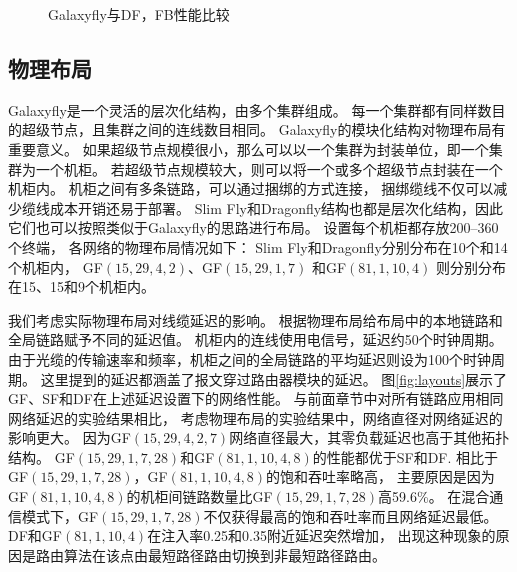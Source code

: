 \begin{figure}
  \centering
  \begin{minipage}[t]{\textwidth}
    \centering
    \caption{Galaxyfly与DF，FB性能比较}
    \label{fig:gfsfdf}
  \end{minipage}
\end{figure}

\subsection{物理布局}

Galaxyfly是一个灵活的层次化结构，由多个集群组成。
每一个集群都有同样数目的超级节点，且集群之间的连线数目相同。
Galaxyfly的模块化结构对物理布局有重要意义。
如果超级节点规模很小，那么可以以一个集群为封装单位，即一个集群为一个机柜。
若超级节点规模较大，则可以将一个或多个超级节点封装在一个机柜内。
机柜之间有多条链路，可以通过捆绑的方式连接，
捆绑缆线不仅可以减少缆线成本开销还易于部署。
Slim Fly和Dragonfly结构也都是层次化结构，因此它们也可以按照类似于Galaxyfly的思路进行布局。
设置每个机柜都存放200--360个终端，
各网络的物理布局情况如下：
Slim Fly和Dragonfly分别分布在10个和14个机柜内，
GF$(15,29,4,2)$、GF$(15,29,1,7)$ 和GF$(81,1,10,4)$
则分别分布在15、15和9个机柜内。

我们考虑实际物理布局对线缆延迟的影响。
根据物理布局给布局中的本地链路和全局链路赋予不同的延迟值。
机柜内的连线使用电信号，延迟约50个时钟周期。
由于光缆的传输速率和频率，机柜之间的全局链路的平均延迟则设为100个时钟周期。
这里提到的延迟都涵盖了报文穿过路由器模块的延迟。
图\ref{fig:layouts}展示了GF、SF和DF在上述延迟设置下的网络性能。
与前面章节中对所有链路应用相同网络延迟的实验结果相比，
考虑物理布局的实验结果中，网络直径对网络延迟的影响更大。
因为GF$(15,29,4,2,7)$网络直径最大，其零负载延迟也高于其他拓扑结构。
GF$(15,29,1,7,28)$和GF$(81,1,10,4,8)$的性能都优于SF和DF.
相比于GF$(15,29,1,7,28)$，GF$(81,1,10,4,8)$的饱和吞吐率略高，
主要原因是因为GF$(81,1,10,4,8)$的机柜间链路数量比GF$(15,29,1,7,28)$高59.6\%。
在混合通信模式下，GF$(15,29,1,7,28)$不仅获得最高的饱和吞吐率而且网络延迟最低。
DF和GF$(81,1,10,4)$在注入率0.25和0.35附近延迟突然增加，
出现这种现象的原因是路由算法在该点由最短路径路由切换到非最短路径路由。

